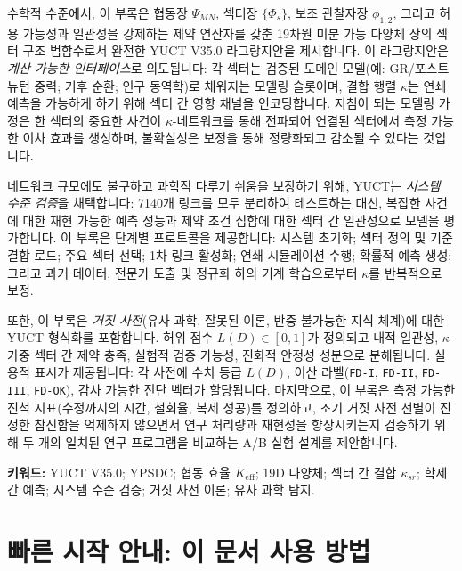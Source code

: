 \documentclass[13pt,a4paper]{article}
\newcommand{\Keff}{K_{\mathrm{eff}}}
\begin{document}
\begin{titlepage}
\begin{center}
\begin{minipage}{0.92\textwidth}
				수학적 수준에서, 이 부록은 협동장 $\Psi_{MN}$, 섹터장 $\{\Phi_s\}$, 보조 관찰자장 $\phi_{1,2}$, 그리고 허용 가능성과 일관성을 강제하는 제약 연산자를 갖춘 19차원 미분 가능 다양체 상의 섹터 구조 범함수로서 완전한 YUCT V35.0 라그랑지안을 제시합니다. 이 라그랑지안은 \emph{계산 가능한 인터페이스}로 의도됩니다: 각 섹터는 검증된 도메인 모델(예: GR/포스트 뉴턴 중력; 기후 순환; 인구 동역학)로 채워지는 모델링 슬롯이며, 결합 행렬 $\kappa$는 연쇄 예측을 가능하게 하기 위해 섹터 간 영향 채널을 인코딩합니다. 지침이 되는 모델링 가정은 한 섹터의 중요한 사건이 $\kappa$-네트워크를 통해 전파되어 연결된 섹터에서 측정 가능한 이차 효과를 생성하며, 불확실성은 보정을 통해 정량화되고 감소될 수 있다는 것입니다.
				
				네트워크 규모에도 불구하고 과학적 다루기 쉬움을 보장하기 위해, YUCT는 \emph{시스템 수준 검증}을 채택합니다: 7140개 링크를 모두 분리하여 테스트하는 대신, 복잡한 사건에 대한 재현 가능한 예측 성능과 제약 조건 집합에 대한 섹터 간 일관성으로 모델을 평가합니다. 이 부록은 단계별 프로토콜을 제공합니다: 시스템 초기화; 섹터 정의 및 기준 결합 로드; 주요 섹터 선택; 1차 링크 활성화; 연쇄 시뮬레이션 수행; 확률적 예측 생성; 그리고 과거 데이터, 전문가 도출 및 정규화 하의 기계 학습으로부터 $\kappa$를 반복적으로 보정.
				
				또한, 이 부록은 \emph{거짓 사전}(유사 과학, 잘못된 이론, 반증 불가능한 지식 체계)에 대한 YUCT 형식화를 포함합니다. 허위 점수 $L(D)\in[0,1]$가 정의되고 내적 일관성, $\kappa$-가중 섹터 간 제약 충족, 실험적 검증 가능성, 진화적 안정성 성분으로 분해됩니다. 실용적 표시가 제공됩니다: 각 사전에 수치 등급 $L(D)$, 이산 라벨(\texttt{FD-I}, \texttt{FD-II}, \texttt{FD-III}, \texttt{FD-OK}), 감사 가능한 진단 벡터가 할당됩니다. 마지막으로, 이 부록은 측정 가능한 진척 지표(수정까지의 시간, 철회율, 복제 성공)를 정의하고, 조기 거짓 사전 선별이 진정한 참신함을 억제하지 않으면서 연구 처리량과 재현성을 향상시키는지 검증하기 위해 두 개의 일치된 연구 프로그램을 비교하는 A/B 실험 설계를 제안합니다.
			\end{minipage}
			
			\vfill
			\small
			\textbf{키워드:} YUCT V35.0; YPSDC; 협동 효율 $\Keff$; 19D 다양체; 섹터 간 결합 $\kappa_{sr}$; 학제간 예측; 시스템 수준 검증; 거짓 사전 이론; 유사 과학 탐지.
		\end{center}
	\end{titlepage}
	
	\section*{빠른 시작 안내: 이 문서 사용 방법}
	
\end{document}
